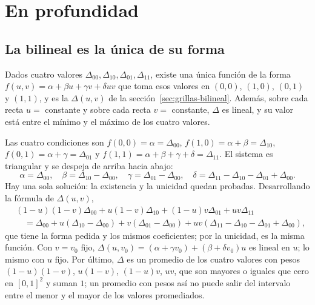 
\section{En profundidad}

\subsection{La bilineal es la única de su forma}\label{sec:bilineal-unica}

\begin{proposicion}\label{prop:bilineal}
Dados cuatro valores \(\Delta_{00},\Delta_{10},\Delta_{01},\Delta_{11}\), existe una única
función de la forma \(f(u,v)=\alpha+\beta u+\gamma v+\delta uv\) que toma esos valores en
\((0,0)\), \((1,0)\), \((0,1)\) y \((1,1)\), y es la \(\Delta(u,v)\) de la
sección~\ref{sec:grillas-bilineal}. Además, sobre cada recta \(u=\) constante y sobre cada recta
\(v=\) constante, \(\Delta\) es lineal, y su valor está entre el mínimo y el máximo de los
cuatro valores.
\end{proposicion}

\begin{demostracion}
Las cuatro condiciones son \(f(0,0)=\alpha=\Delta_{00}\), \(f(1,0)=\alpha+\beta=\Delta_{10}\),
\(f(0,1)=\alpha+\gamma=\Delta_{01}\) y \(f(1,1)=\alpha+\beta+\gamma+\delta=\Delta_{11}\). El
sistema es triangular y se despeja de arriba hacia abajo:
\[
\alpha=\Delta_{00},\quad \beta=\Delta_{10}-\Delta_{00},\quad \gamma=\Delta_{01}-\Delta_{00},\quad
\delta=\Delta_{11}-\Delta_{10}-\Delta_{01}+\Delta_{00}.
\]
Hay una sola solución: la existencia y la unicidad quedan probadas. Desarrollando la fórmula de
\(\Delta(u,v)\),
\[
\begin{aligned}
&(1-u)(1-v)\Delta_{00}+u(1-v)\Delta_{10}+(1-u)v\Delta_{01}+uv\Delta_{11}\\
&\quad=\Delta_{00}+u(\Delta_{10}-\Delta_{00})+v(\Delta_{01}-\Delta_{00})+uv(\Delta_{11}-\Delta_{10}-\Delta_{01}+\Delta_{00}),
\end{aligned}
\]
que tiene la forma pedida y los mismos coeficientes; por la unicidad, es la misma función. Con
\(v=v_0\) fijo, \(\Delta(u,v_0)=(\alpha+\gamma v_0)+(\beta+\delta v_0)u\) es lineal en \(u\); lo
mismo con \(u\) fijo. Por último, \(\Delta\) es un promedio de los cuatro valores con pesos
\((1-u)(1-v)\), \(u(1-v)\), \((1-u)v\), \(uv\), que son mayores o iguales que cero en
\([0,1]^2\) y suman \(1\); un promedio con pesos así no puede salir del intervalo entre el
menor y el mayor de los valores promediados.
\end{demostracion}

